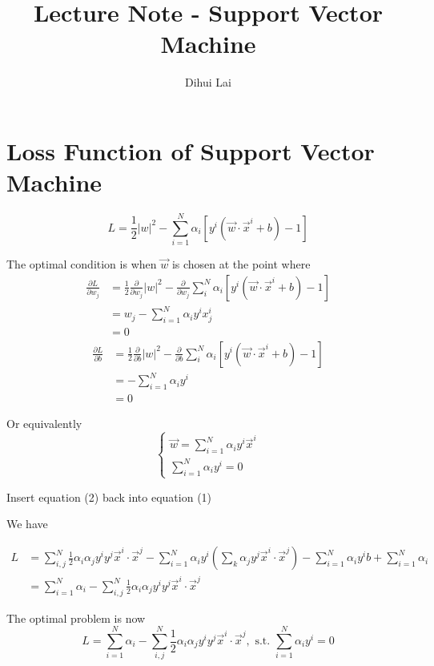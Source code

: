 \documentclass[12pt, oneside]{article}
\title{Lecture Note - Support Vector Machine}
\author{Dihui Lai}
\begin{document}
\maketitle
\tableofcontents

\vspace{.25in}

\section{Loss Function of Support Vector Machine}
\begin{equation}
L=\frac{1}{2}|w|^2-\sum\limits_{i=1}^{N}\alpha_i\left[y^i(\vec{w}\cdot \vec{x}^i+b)-1\right]
\end{equation}

The optimal condition is when $\vec{w}$ is chosen at the point where
\begin{align*}
\frac{\partial L}{\partial w_j}&=\frac{1}{2}\frac{\partial}{\partial w_j}|w|^2-\frac{\partial}{\partial w_j}\sum\limits_{i}^N\alpha_i\left[y^i(\vec{w}\cdot \vec{x}^i+b)-1\right]\\
&=w_j-\sum\limits_{i=1}^N \alpha_i y^i x_j^i\\
&=0
\end{align*}
\begin{align*}
\frac{\partial L}{\partial b}&=\frac{1}{2}\frac{\partial}{\partial b}|w|^2-\frac{\partial}{\partial b}\sum\limits_{i}^N\alpha_i\left[y^i(\vec{w}\cdot \vec{x}^i+b)-1\right]\\
&=-\sum\limits_{i=1}^N \alpha_i y^i\\
&=0
\end{align*}

Or equivalently 
\begin{equation}
\begin{cases}
\vec{w}=\sum\limits_{i=1}^N \alpha_i y^i \vec{x}^i\\
\sum\limits_{i=1}^N \alpha_i y^i=0
\end{cases}
\end{equation}

Insert equation (2) back into equation (1)

We have

\begin{align*}
L&=\sum_{i,j}^{N}\frac{1}{2}\alpha_i\alpha_j y^i y^j \vec{x}^i\cdot\vec{x}^j-\sum\limits_{i=1}^{N}\alpha_i y^i(\sum_{k}\alpha_j y^j\vec{x}^i\cdot\vec{x}^j)-\sum\limits_{i=1}^{N}\alpha_i y^i b+\sum\limits_{i=1}^{N} \alpha_i\\
&=\sum\limits_{i=1}^{N} \alpha_i-\sum_{i,j}^{N}\frac{1}{2}\alpha_i\alpha_j y^i y^j \vec{x}^i\cdot\vec{x}^j
\end{align*}

The optimal problem is now
\begin{equation}
L=\sum\limits_{i=1}^{N} \alpha_i-\sum_{i,j}^{N}\frac{1}{2}\alpha_i\alpha_j y^i y^j \vec{x}^i\cdot\vec{x}^j, \text{ s.t. } \sum\limits_{i=1}^N \alpha_i y^i=0
\end{equation}
\end{document}
